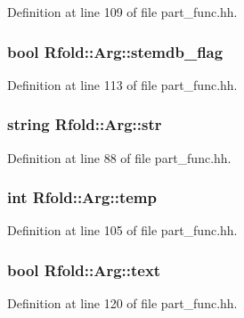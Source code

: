 Definition at line 109 of file part\+\_\+func.\+hh.

\hypertarget{class_rfold_1_1_arg_ad5d34ff788f8795f1e75f313dd67c79e}{
\subsubsection[{stemdb\+\_\+flag}]{\setlength{\rightskip}{0pt plus 5cm}bool Rfold\+::\+Arg\+::stemdb\+\_\+flag}}\label{class_rfold_1_1_arg_ad5d34ff788f8795f1e75f313dd67c79e}


Definition at line 113 of file part\+\_\+func.\+hh.

\hypertarget{class_rfold_1_1_arg_a10258eb45eb764844e49e5587e187af7}{
\subsubsection[{str}]{\setlength{\rightskip}{0pt plus 5cm}string Rfold\+::\+Arg\+::str}}\label{class_rfold_1_1_arg_a10258eb45eb764844e49e5587e187af7}


Definition at line 88 of file part\+\_\+func.\+hh.

\hypertarget{class_rfold_1_1_arg_a25e15defa3a3a80e6a0593989ea9e44a}{
\subsubsection[{temp}]{\setlength{\rightskip}{0pt plus 5cm}int Rfold\+::\+Arg\+::temp}}\label{class_rfold_1_1_arg_a25e15defa3a3a80e6a0593989ea9e44a}


Definition at line 105 of file part\+\_\+func.\+hh.

\hypertarget{class_rfold_1_1_arg_ad174f7be713784b338a8e3423c950dac}{
\subsubsection[{text}]{\setlength{\rightskip}{0pt plus 5cm}bool Rfold\+::\+Arg\+::text}}\label{class_rfold_1_1_arg_ad174f7be713784b338a8e3423c950dac}


Definition at line 120 of file part\+\_\+func.\+hh.

